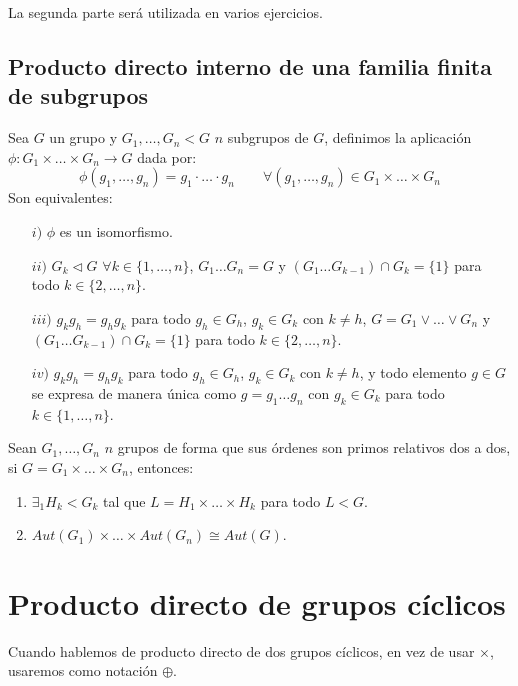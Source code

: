 La segunda parte será utilizada en varios ejercicios.

\subsection{Producto directo interno de una familia finita de subgrupos}
\begin{teo}
    Sea $G$ un grupo y $G_1,\ldots,G_n < G$ $n$ subgrupos de $G$, definimos la aplicación $\phi:G_1\times \ldots \times G_n\to G$ dada por:
    \begin{equation*}
        \phi(g_1,\ldots,g_n) = g_1\cdot \ldots \cdot g_n \qquad \forall (g_1,\ldots,g_n)\in G_1\times \ldots \times G_n
    \end{equation*}
    Son equivalentes:
    \begin{enumerate}
        \item[$i)$] $\phi$ es un isomorfismo.
        \item[$ii)$] $G_k\lhd G$ $\forall k\in \{1,\ldots,n\}$, $G_1\ldots G_n = G$ y $(G_1 \ldots G_{k-1}) \cap G_k = \{1\}$ para todo $k\in \{2,\ldots,n\}$.
        \item[$iii)$] $g_k g_h = g_h g_k$ para todo $g_h\in G_h$, $g_k\in G_k$ con $k\neq h$, $G = G_1\lor \ldots \lor G_n$ y $(G_1 \ldots G_{k-1}) \cap G_k = \{1\}$ para todo $k\in \{2,\ldots,n\}$.
        \item[$iv)$] $g_k g_h = g_h g_k$ para todo $g_h\in G_h$, $g_k\in G_k$ con $k\neq h$, y todo elemento $g\in G$ se expresa de manera única como $g= g_1\ldots g_n$ con $g_k \in G_k$ para todo $k \in \{1,\ldots,n\}$.
    \end{enumerate}
\end{teo}

\begin{teo}
    Sean $G_1,\ldots,G_n$ $n$ grupos de forma que sus órdenes son primos relativos dos a dos, si $G = G_1 \times \ldots \times G_n$, entonces:
    \begin{enumerate}
        \item $\exists_1 H_k < G_k$ tal que $L = H_1\times \ldots \times H_k$ para todo $L<G$.
        \item $Aut(G_1)\times \ldots \times Aut(G_n)\cong Aut(G)$.
    \end{enumerate}
\end{teo}

\section{Producto directo de grupos cíclicos}
\begin{notacion}
    Cuando hablemos de producto directo de dos grupos cíclicos, en vez de usar $\times$, usaremos como notación $\oplus$.
\end{notacion}

